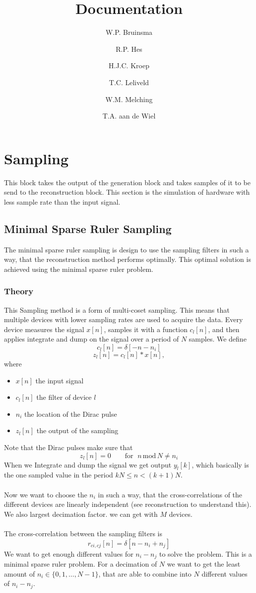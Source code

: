 \documentclass[report, oneside, a4paper, openany]{memoir}
\title{Documentation}
\author{W.P. Bruinsma \and R.P. Hes \and H.J.C. Kroep \and T.C. Leliveld \and W.M. Melching \and T.A. aan de Wiel}
\begin{document}
\chapter{Sampling}
This block takes the output of the generation block and takes samples of it to be send to the reconstruction block. 
This section is the simulation of hardware with less sample rate than the input signal.


\section{Minimal Sparse Ruler Sampling}
The minimal sparse ruler sampling is design to use the sampling filters in such a way, that the reconstruction method performs optimally. This optimal solution is achieved using the minimal sparse ruler problem.
\subsection{Theory}
This Sampling method is a form of multi-coset sampling. This means that multiple devices with lower sampling rates are used to acquire the data. Every device measures the signal $x[n]$, samples it with a function $c_l[n]$, and then applies integrate and dump on the signal over a period of $N$ samples. We define 
$$
c_l[n] = \delta[-n -n_i]
$$
$$
z_l[n] = c_l[n]\ast x[n],
$$
where
\begin{itemize}
\item $x[n]$ the input signal
\item $c_l[n]$ the filter of device $l$
\item $n_i$ the location of the Dirac pulse
\item $z_l[n]$ the output of the sampling
\end{itemize}
Note that the Dirac pulses make sure that
$$z_l[n]=0 \quad \quad \text{for }\;n\,\text{mod}\,N\neq n_i$$
When we Integrate and dump the signal we get output $y_l[k]$, which basically is the one sampled value in the period $kN\leq n<(k+1)N$.\\
\\
Now we want to choose the $n_i$ in such a way, that the cross-correlations of the different devices are linearly independent (see reconstruction to understand this). We also largest decimation factor. we can get with $M$ devices.\\
\\
The cross-correlation between the sampling filters is 
$$
r_{ci,cj}[n] = \delta [n-n_i+n_j]
$$
We want to get enough different values for $n_i-n_j$ to solve the problem. This is a minimal sparse ruler problem. For a decimation of $N$ we want to get the least amount of $n_i \in \{0,1,\dots,N-1\}$, that are able to combine into $N$ different values of $n_i-n_j$. 
\end{document}
